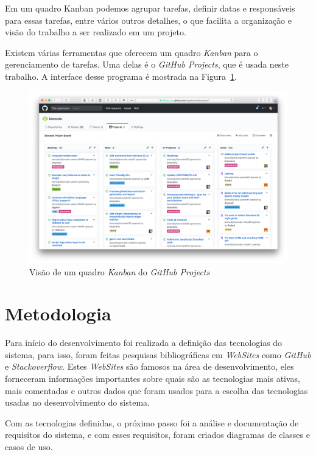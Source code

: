 \documentclass[12pt]{article}
\begin{document}
Em um quadro Kanban podemos agrupar tarefas, definir datas e responsáveis para essas tarefas, entre vários outros
detalhes, o que facilita a organização e visão do trabalho a ser realizado em um projeto.

Existem várias ferramentas que oferecem um quadro \textit{Kanban} para o gerenciamento de tarefas.
Uma delas é o \emph{GitHub Projects}, que é usada neste trabalho. A interface desse programa é mostrada na Figura~\ref{fig:github-board}.

\begin{figure}[h]
  \centering
  \includegraphics[width=1\textwidth]{github/github-board.png}
  \caption{Visão de um quadro \textit{Kanban} do \emph{GitHub Projects}}\label{fig:github-board}
\end{figure}



\section{Metodologia}\label{Metodologia}

Para início do desenvolvimento foi realizada a definição das tecnologias do sistema, para isso, foram feitas
pesquisas bibliográficas em \textit{WebSites} como \textit{GitHub} e \textit{Stackoverflow}. Estes \textit{WebSites}
são famosos na área de desenvolvimento, eles forneceram informações importantes sobre quais
são as tecnologias mais ativas, mais comentadas e outros dados que foram usados para a escolha das tecnologias
usadas no desenvolvimento do sistema.

Com as tecnologias definidas, o próximo passo foi a análise e documentação de requisitos do sistema,
e com esses requisitos, foram criados diagramas de classes e casos de uso.
\end{document}
